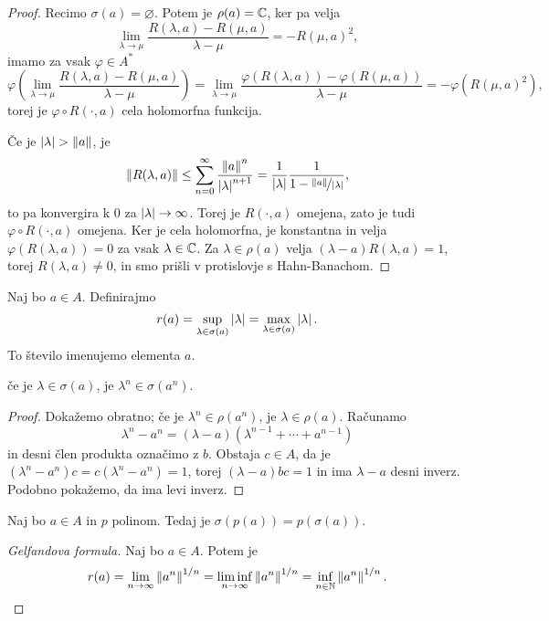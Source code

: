 \begin{proof}
  Recimo $\sigma(a) = \varnothing$.
  Potem je $\rho(a) = \mathbb{C}$, ker pa velja
  \[
	\lim_{\lambda \to \mu} \frac{R(\lambda, a) - R(\mu, a)}{\lambda - \mu} =
	-R(\mu, a)^2,
  \]
  imamo za vsak $\varphi \in A^*$
  \[
	\varphi\!\left( \lim_{\lambda \to \mu} \frac{R(\lambda, a) - R(\mu,
		a)}{\lambda - \mu} \right)
	= \lim_{\lambda \to \mu} \frac{\varphi(R(\lambda, a)) - \varphi(R(\mu,
	  a))}{\lambda - \mu}
	= - \varphi(R(\mu, a)^2),
  \]
  torej je $\varphi \circ R(\cdot, a)$ cela holomorfna funkcija.

  Če je $\left| \lambda \right| > \left\lVert a\right\rVert$, je
  \[
	\left\lVert R(\lambda, a)\right\rVert \le \sum_{n=0}^\infty
	\frac{\left\lVert a\right\rVert^n}{\left| \lambda \right|^{n+1}}
	= \frac{1}{\left| \lambda \right|} \frac{1}{1 - \nicefrac{\left\lVert a\right\rVert}{\left| \lambda \right|}},
  \]
  to pa konvergira k $0$ za $\left| \lambda \right| \to \infty$.
  Torej je $R(\cdot, a)$ omejena, zato je tudi $\varphi \circ R(\cdot, a)$
  omejena.
  Ker je cela holomorfna, je konstantna in velja $\varphi(R(\lambda, a)) = 0$ za
  vsak $\lambda \in \mathbb{C}$.
  Za $\lambda \in \rho(a)$ velja $(\lambda - a)R(\lambda, a) = 1$, torej
  $R(\lambda, a) \ne 0$, in smo prišli v protislovje s Hahn-Banachom.
\end{proof}

\begin{definicija}
  Naj bo $a \in A$.
  Definirajmo
  \[
	r(a) = \sup_{\lambda \in \sigma(a)} \left| \lambda \right| = \max_{\lambda \in
	  \sigma(a)} \left| \lambda \right|.
  \]
  To število imenujemo  elementa $a$.
\end{definicija}

\begin{lema}
  če je $\lambda \in \sigma(a)$, je $\lambda^n \in \sigma(a^n)$.
\end{lema}

\begin{proof}
  Dokažemo obratno; če je $\lambda^n \in \rho(a^n)$, je $\lambda \in \rho(a)$.
  Računamo
  \[
	\lambda^n - a^n = (\lambda -a)(\lambda^{n-1} + \cdots + a^{n-1})
  \]
  in desni člen produkta označimo z $b$.
  Obstaja $c \in A$, da je $(\lambda^n - a^n)c = c(\lambda^n - a^n) =1$, torej
  $(\lambda - a)bc = 1$ in ima $\lambda - a$ desni inverz.
  Podobno pokažemo, da ima levi inverz.
\end{proof}

\begin{trditev}
  Naj bo $a \in A$ in $p$ polinom.
  Tedaj je $\sigma(p(a)) = p(\sigma(a))$.
\end{trditev}

\begin{proof}[Gelfandova formula]
  Naj bo $a \in A$.
  Potem je
  \[
	r(a) = \lim_{n \to \infty} \left\lVert a^n\right\rVert^{1/n} = \liminf_{n \to \infty}
	\left\lVert a^n\right\rVert^{1/n}
	= \inf_{n \in \mathbb{N}} \left\lVert a^n\right\rVert^{1/n}.
  \]
\end{proof}

